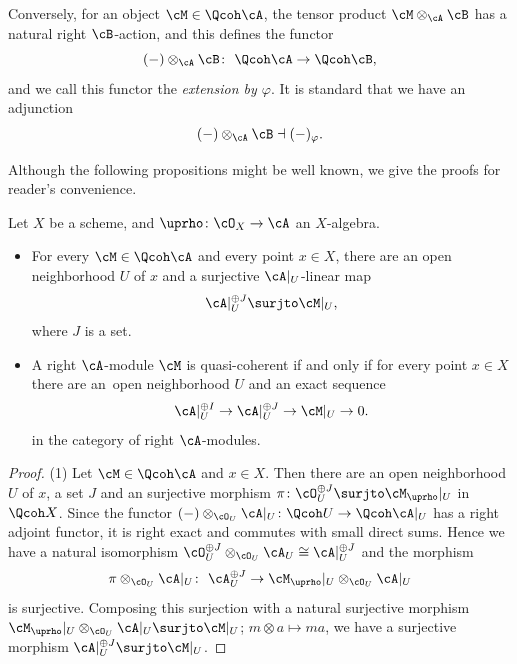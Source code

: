 Conversely, for an object $\cM\in \Qcoh \cA$, the tensor product
$\cM\otimes_{\cA}\cB$ has a natural right $\cB$-action, and this defines the functor\vspace{-.7ex}
\begin{equation}\label{extension}
(-)\otimes_\cA\cB\colon\ \Qcoh \cA\to \Qcoh \cB,
\end{equation}
and we call this functor the {\it extension by $\varphi$}.
It is standard that we have an adjunction\vspace{-.7ex}
\begin{gather*}
(-)\otimes_\cA\cB \dashv (-)_{\varphi}.
\end{gather*}

Although the following propositions might be well known, we give the proofs for reader's convenience.
\begin{prop}
Let $X$ be a scheme, and $\uprho\colon \cO_X\to\cA$ an $X$-algebra.\vspace{-.5ex}
\begin{itemize}\itemsep=-1pt
\item[$1.$] For every $\cM\in \Qcoh \cA$ and every point $x\in X$, there are an open neighborhood $U$ of $x$ and a surjective $\cA|_U$-linear map\vspace{-.7ex}
\begin{gather*}
\cA|_U^{\oplus J}\surjto \cM|_U,
\end{gather*}
where $J$ is a set.
\item[$2.$] A right $\cA$-module $\cM$ is quasi-coherent if and only if for every point $x\in X$ there are an~open neighborhood $U$ and an exact sequence\vspace{-.7ex}
 \begin{gather*}
 \cA|_U^{\oplus I}\to \cA|_U^{\oplus J}\to \cM|_U\to 0.
 \end{gather*}
 in the category of right $\cA$-modules.
\end{itemize}
 \begin{proof}
 (1) Let $\cM\in \Qcoh \cA$ and $x\in X$. Then there are an open neighborhood $U$ of $x$, a set $J$ and an surjective morphism
 $\pi\colon \cO_U^{\oplus J}\surjto\cM_{\uprho}|_U$
 in $\Qcoh X$. Since the functor $(-)\otimes_{\cO_U}\cA|_U\colon \Qcoh U\to \Qcoh \cA|_U$ has a right adjoint functor, it is right exact and commutes with small direct sums. Hence we have a natural isomorphism $\cO_U^{\oplus J}\otimes _{\cO_U}\cA_U\cong \cA|_U^{\oplus J}$ and the morphism
{\samepage \begin{gather*}
 \pi\otimes_{\cO_U}\cA|_U\colon\ \cA_U^{\oplus J}\to \cM_{\uprho}|_U\otimes_{\cO_U}\cA|_U
 \end{gather*}
 is surjective. Composing this surjection with a natural surjective morphism
 $\cM_{\uprho}|_U\otimes_{\cO_U}\cA|_U\surjto \cM|_U$; $m\otimes a\mapsto ma$, we have a surjective morphism $\cA|_U^{\oplus J}\surjto \cM|_U$.}


\end{proof}
\end{prop}
